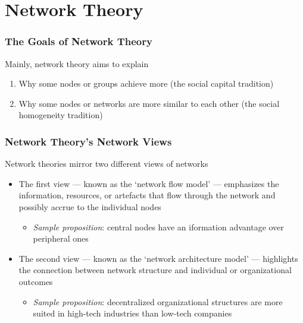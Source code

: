 \documentclass[notes, aspectratio=1610]{beamer}
\begin{document}
\section{Network Theory}

\begin{frame}
	\frametitle{The Goals of Network Theory}
	Mainly, network theory aims to explain

	\begin{enumerate}
		\item Why some nodes or groups achieve more (the 
		social capital tradition)
		\item Why some nodes or  networks  are  more  similar  to  
		each  other  (the  social   homogeneity   tradition)
	\end{enumerate}
	
\end{frame}

\begin{frame}
	\frametitle{Network Theory's Network Views}

	Network theories mirror two different views of networks

	\begin{itemize}
		\item The first view --- known as the `network flow model' 
		--- emphasizes the information, resources, or artefacts 
		that flow through the network and possibly accrue to 
		the individual nodes
		\begin{itemize}
			\item \textit{Sample proposition}: central nodes have an iformation advantage
			over peripheral ones
		\end{itemize}
		\item The second view --- known as the `network architecture 
		model' --- highlights the connection between network structure 
		and individual or organizational outcomes  
		\begin{itemize}
			\item \textit{Sample proposition}: decentralized organizational 
			structures are more suited in high-tech industries than
			low-tech companies
		\end{itemize}
	\end{itemize}
\end{frame}
\end{document}
